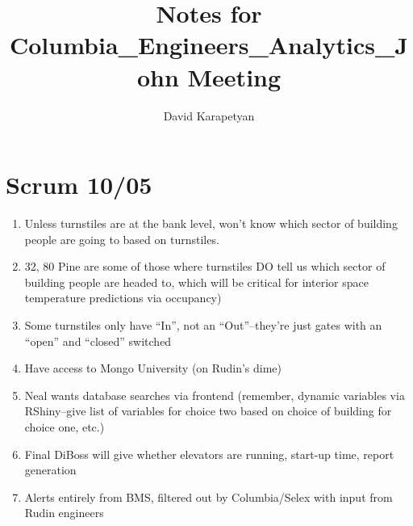 \documentclass[12pt,a4paper]{article}
\author{David Karapetyan}
\title{Notes for Columbia_Engineers_Analytics_John Meeting}
\begin{document}
\section{Scrum 10/05}
\begin{enumerate}
	\item Unless turnstiles are at the bank level, won't know which sector of 
	building people are going to based on turnstiles.
	\item 32, 80 Pine are some of 
	those where turnstiles DO tell us which sector of building people are 
	headed to, which will be critical for interior space temperature 
	predictions via occupancy)
	\item Some turnstiles only have ``In'', not an ``Out''--they're just gates 
	with an ``open'' and ``closed'' switched
	\item Have access to Mongo University (on Rudin's dime)
	\item Neal wants database searches via frontend (remember, dynamic 
	variables via RShiny--give list of variables for choice two based on choice 
	of building for choice one, etc.)
	\item Final DiBoss will give whether elevators are running, start-up time, 
	report generation 
	\item Alerts entirely from BMS, filtered out by Columbia/Selex with input 
	from Rudin engineers
\end{enumerate}
\end{document}
